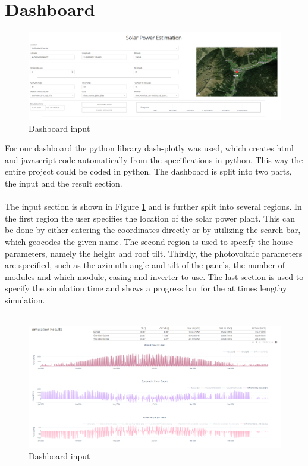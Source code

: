 \documentclass[12pt]{report}
\begin{document}
\section*{Dashboard}
\begin{figure}[H]
    \centering
    \includegraphics[width=1.0\linewidth]{images/dashboard_input.PNG}
    \caption{Dashboard input}
    \label{fig:input}
\end{figure}
\noindent For our dashboard the python library dash-plotly \cite{.02.10.2023c} was used, which creates html and javascript code automatically from the specifications in python.
This way the entire project could be coded in python. The dashboard is split into two parts, the input and the result section.
\\~\\
The input section is shown in Figure \ref{fig:input} and is further split into several regions. In the first region the user specifies the location of the solar power plant. This can be done by either entering the
coordinates directly or by utilizing the search bar, which geocodes the given name. The second region is used to specify the house parameters, namely the height and roof tilt.
Thirdly, the photovoltaic parameters are specified, such as the azimuth angle and tilt of the panels, the number of modules and which module, casing and inverter to use. 
The last section is used to specify the simulation time and shows a progress bar for the at times lengthy simulation.
\\~\\
\begin{figure}[H]
    \centering
    \includegraphics[width=1.0\linewidth]{images/dashboard_output.PNG}
    \caption{Dashboard input}
    \label{fig:output}
\end{figure}
\end{document}
